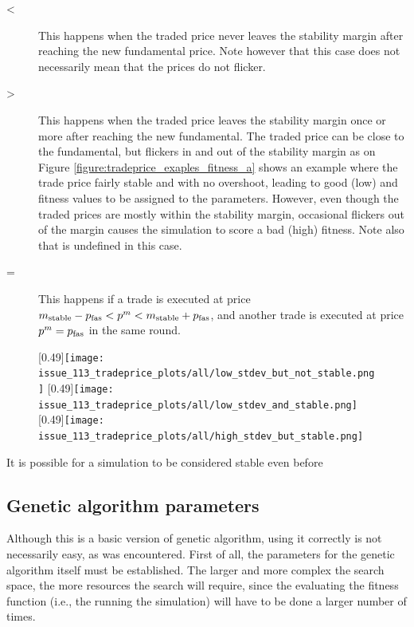 \begin{description}
\item[\roundstable < \timetoreachnewfundamental] This happens when the traded price never leaves the stability margin after reaching the new fundamental price. Note however that this case does not necessarily mean that the prices do not flicker. 
\item[\roundstable > \timetoreachnewfundamental] This happens when the traded price leaves the stability margin once or more after reaching the new fundamental. The traded price can be close to the fundamental, but flickers in and out of the stability margin as on Figure \ref{figure:tradeprice_exaples_fitness_a} shows an example where the trade price fairly stable and with no overshoot, leading to good (low) \stdev and \overshoot fitness values to be assigned to the parameters. However, even though the traded prices are mostly within the stability margin, occasional flickers out of the margin causes the simulation to score a bad (high) \roundstable fitness. Note also that \timetoreachnewfundamental is undefined in this case. 
\item[\roundstable = \timetoreachnewfundamental] This happens if a trade is executed at price $m_\text{stable} - p_\text{fas} < p^m < m_\text{stable} + p_\text{fas}$, and another trade is executed at price $p^m = p_\text{fas}$ in the same round. 
\end{description}

\begin{figure}
\centering
\subcaptionbox{\label{figure:tradeprice_exaples_fitness_a}}
[0.49\linewidth]{\texttt{[image: issue\_113\_tradeprice\_plots/all/low\_stdev\_but\_not\_stable.png]}}
\subcaptionbox{\label{figure:tradeprice_exaples_fitness_b}}
[0.49\linewidth]{\texttt{[image: issue\_113\_tradeprice\_plots/all/low\_stdev\_and\_stable.png]}}
\subcaptionbox{\label{figure:tradeprice_exaples_fitness_c}}
[0.49\linewidth]{\texttt{[image: issue\_113\_tradeprice\_plots/all/high\_stdev\_but\_stable.png]}}
\label{figure:tradeprice_exaples_fitness}
\end{figure}

\begin{description}
\item[\overshoot]
\end{description}

It is possible for a simulation to be considered stable even before

\subsection{Genetic algorithm parameters}\label{section:ga_parameters}
Although this is a basic version of genetic algorithm, using it correctly is not necessarily easy, as was encountered. First of all, the parameters for the genetic algorithm itself must be established. The larger and more complex the search space, the more resources the search will require, since the evaluating the fitness function (i.e., the running the simulation) will have to be done a larger number of times. 



